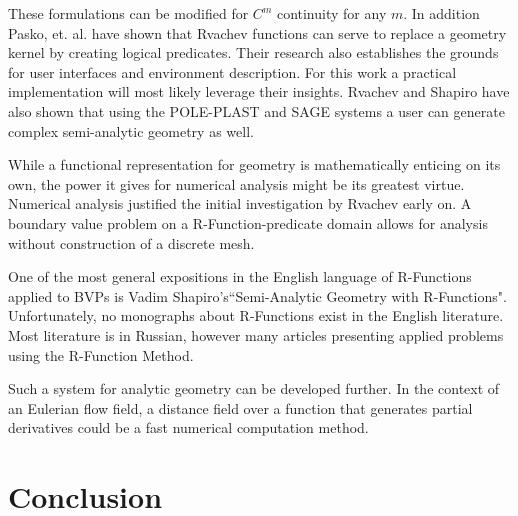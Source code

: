 \documentclass[a4paper]{article}
\begin{document}
These formulations can be modified for $C^m$ continuity for any $m$.
\cite{shapiro2007semi} In addition Pasko, et. al. have shown that Rvachev
functions can serve to replace a geometry kernel by creating logical
predicates. \cite{pasko1995function} Their research also establishes the
grounds for user interfaces and environment description. For this work a
practical implementation will most likely leverage their insights.
Rvachev and Shapiro have also shown that using the POLE-PLAST and SAGE
systems a user can generate complex semi-analytic geometry
as well.\cite{rvachev2000completeness} 

While a functional representation for geometry is mathematically enticing on
its own, the power it gives for numerical analysis might be its greatest
virtue. Numerical analysis justified the initial investigation by Rvachev
early on. A boundary value problem on a R-Function-predicate domain allows
for analysis without construction of a discrete mesh.\cite{rvachev2000completeness}

One of the most general expositions in the English language of R-Functions
applied to BVPs is
Vadim Shapiro's``Semi-Analytic Geometry with R-Functions". \cite{shapiro2007semi}
Unfortunately, no monographs about R-Functions exist in the English literature.
Most literature is in Russian, however many articles presenting applied
problems using the R-Function Method. \cite{voron2010}

Such a system for analytic geometry can be developed further. In the context
of an Eulerian flow field, a distance field over a function that
generates partial derivatives could be a fast numerical computation method.

\section{Conclusion}



\end{document}
